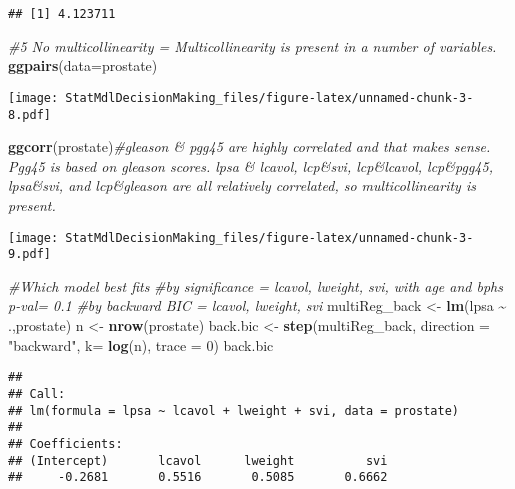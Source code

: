\documentclass[
]{article}
\newenvironment{Shaded}{\begin{snugshade}}{\end{snugshade}}
\newcommand{\AttributeTok}[1]{\textcolor[rgb]{0.13,0.29,0.53}{#1}}
\newcommand{\CommentTok}[1]{\textcolor[rgb]{0.56,0.35,0.01}{\textit{#1}}}
\newcommand{\DecValTok}[1]{\textcolor[rgb]{0.00,0.00,0.81}{#1}}
\newcommand{\FunctionTok}[1]{\textcolor[rgb]{0.13,0.29,0.53}{\textbf{#1}}}
\newcommand{\NormalTok}[1]{#1}
\newcommand{\OtherTok}[1]{\textcolor[rgb]{0.56,0.35,0.01}{#1}}
\newcommand{\SpecialCharTok}[1]{\textcolor[rgb]{0.81,0.36,0.00}{\textbf{#1}}}
\newcommand{\StringTok}[1]{\textcolor[rgb]{0.31,0.60,0.02}{#1}}
\begin{document}
\begin{verbatim}
## [1] 4.123711
\end{verbatim}

\begin{Shaded}
\begin{Highlighting}[]
    \CommentTok{\#5 No multicollinearity = Multicollinearity is present in a number of variables.}
      \FunctionTok{ggpairs}\NormalTok{(}\AttributeTok{data=}\NormalTok{prostate)}
\end{Highlighting}
\end{Shaded}

\texttt{[image: StatMdlDecisionMaking\_files/figure-latex/unnamed-chunk-3-8.pdf]}

\begin{Shaded}
\begin{Highlighting}[]
      \FunctionTok{ggcorr}\NormalTok{(prostate)}\CommentTok{\#gleason \& pgg45 are highly correlated and that makes sense. Pgg45 is based on gleason scores. lpsa \& lcavol, lcp\&svi, lcp\&lcavol, lcp\&pgg45,  lpsa\&svi, and lcp\&gleason are all relatively correlated, so multicollinearity is present.}
\end{Highlighting}
\end{Shaded}

\texttt{[image: StatMdlDecisionMaking\_files/figure-latex/unnamed-chunk-3-9.pdf]}

\begin{Shaded}
\begin{Highlighting}[]
\CommentTok{\#Which model best fits}
  \CommentTok{\#by significance = lcavol, lweight, svi, with age and bph\textquotesingle{}s p{-}val= 0.1}
  \CommentTok{\#by backward BIC = lcavol, lweight, svi}
\NormalTok{    multiReg\_back }\OtherTok{\textless{}{-}} \FunctionTok{lm}\NormalTok{(lpsa }\SpecialCharTok{\textasciitilde{}}\NormalTok{ .,prostate)}
\NormalTok{    n }\OtherTok{\textless{}{-}} \FunctionTok{nrow}\NormalTok{(prostate)}
\NormalTok{    back.bic }\OtherTok{\textless{}{-}} \FunctionTok{step}\NormalTok{(multiReg\_back, }\AttributeTok{direction =} \StringTok{"backward"}\NormalTok{,  }\AttributeTok{k=} \FunctionTok{log}\NormalTok{(n), }\AttributeTok{trace =} \DecValTok{0}\NormalTok{)}
\NormalTok{    back.bic}
\end{Highlighting}
\end{Shaded}

\begin{verbatim}
## 
## Call:
## lm(formula = lpsa ~ lcavol + lweight + svi, data = prostate)
## 
## Coefficients:
## (Intercept)       lcavol      lweight          svi  
##     -0.2681       0.5516       0.5085       0.6662
\end{verbatim}
\end{document}
